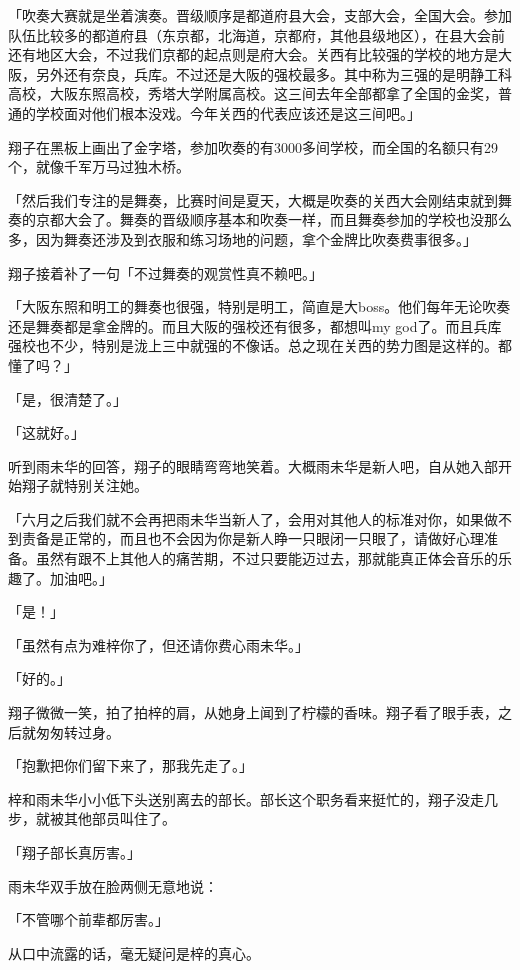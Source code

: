 \documentclass[UTF8]{ctexart}
\begin{document}
    「吹奏大赛就是坐着演奏。晋级顺序是都道府县大会，支部大会，全国大会。参加队伍比较多的都道府县（东京都，北海道，京都府，其他县级地区），在县大会前还有地区大会，不过我们京都的起点则是府大会。关西有比较强的学校的地方是大阪，另外还有奈良，兵库。不过还是大阪的强校最多。其中称为三强的是明静工科高校，大阪东照高校，秀塔大学附属高校。这三间去年全部都拿了全国的金奖，普通的学校面对他们根本没戏。今年关西的代表应该还是这三间吧。」

    翔子在黑板上画出了金字塔，参加吹奏的有3000多间学校，而全国的名额只有29个，就像千军万马过独木桥。

    「然后我们专注的是舞奏，比赛时间是夏天，大概是吹奏的关西大会刚结束就到舞奏的京都大会了。舞奏的晋级顺序基本和吹奏一样，而且舞奏参加的学校也没那么多，因为舞奏还涉及到衣服和练习场地的问题，拿个金牌比吹奏费事很多。」

    翔子接着补了一句「不过舞奏的观赏性真不赖吧。」

    「大阪东照和明工的舞奏也很强，特别是明工，简直是大boss。他们每年无论吹奏还是舞奏都是拿金牌的。而且大阪的强校还有很多，都想叫my god了。而且兵库强校也不少，特别是泷上三中就强的不像话。总之现在关西的势力图是这样的。都懂了吗？」

    「是，很清楚了。」

    「这就好。」

    听到雨未华的回答，翔子的眼睛弯弯地笑着。大概雨未华是新人吧，自从她入部开始翔子就特别关注她。

    「六月之后我们就不会再把雨未华当新人了，会用对其他人的标准对你，如果做不到责备是正常的，而且也不会因为你是新人睁一只眼闭一只眼了，请做好心理准备。虽然有跟不上其他人的痛苦期，不过只要能迈过去，那就能真正体会音乐的乐趣了。加油吧。」

    「是！」

    「虽然有点为难梓你了，但还请你费心雨未华。」

    「好的。」

    翔子微微一笑，拍了拍梓的肩，从她身上闻到了柠檬的香味。翔子看了眼手表，之后就匆匆转过身。

    「抱歉把你们留下来了，那我先走了。」

    梓和雨未华小小低下头送别离去的部长。部长这个职务看来挺忙的，翔子没走几步，就被其他部员叫住了。

    「翔子部长真厉害。」

    雨未华双手放在脸两侧无意地说：

    「不管哪个前辈都厉害。」

    从口中流露的话，毫无疑问是梓的真心。
\end{document}
